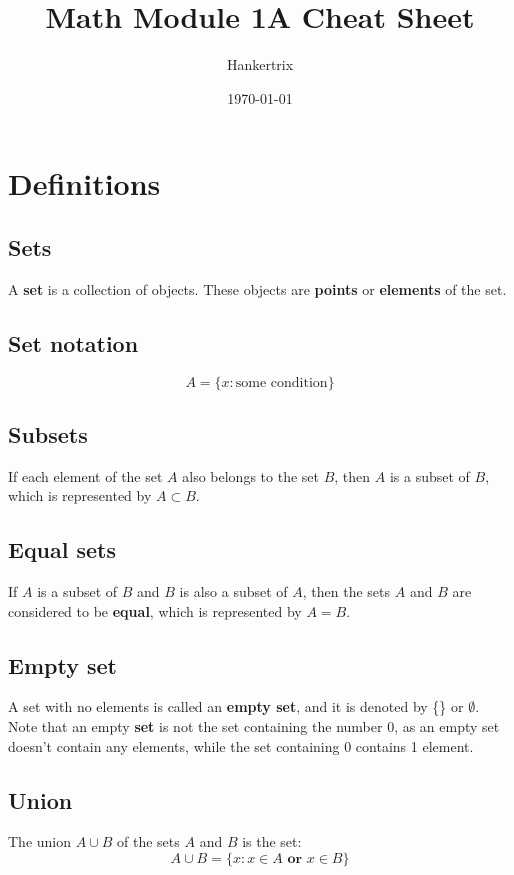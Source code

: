\documentclass[11pt]{article}
\author{Hankertrix}
\date{\today}
\title{Math Module 1A Cheat Sheet}
\begin{document}
\maketitle
\setcounter{tocdepth}{2}
\tableofcontents

\newpage

\section{Definitions}
\label{sec:org36615fd}

\subsection{Sets}
\label{sec:orgd064ffc}
A \textbf{set} is a collection of objects. These objects are \textbf{points} or \textbf{elements} of the set.

\subsection{Set notation}
\label{sec:org884ce81}
\[A = \{x: \text{some condition}\}\]

\subsection{Subsets}
\label{sec:org9d78380}
If each element of the set \(A\) also belongs to the set \(B\), then \(A\) is a subset of \(B\), which is represented by \(A \subset B\).

\subsection{Equal sets}
\label{sec:orgfdd19a7}
If \(A\) is a subset of \(B\) and \(B\) is also a subset of \(A\), then the sets \(A\) and \(B\) are considered to be \textbf{equal}, which is represented by \(A = B\).

\subsection{Empty set}
\label{sec:org289fe8d}
A set with no elements is called an \textbf{empty set}, and it is denoted by \{\} or \(\emptyset\).
\\[0pt]

Note that an empty \textbf{set} is not the set containing the number 0, as an empty set doesn't contain any elements, while the set containing 0 contains 1 element.

\subsection{Union}
\label{sec:org31802b5}
The union \(A \cup B\) of the sets \(A\) and \(B\) is the set:
\[A \cup B = \{x : x \in A \textbf{ or } x \in B\}\]
\end{document}
